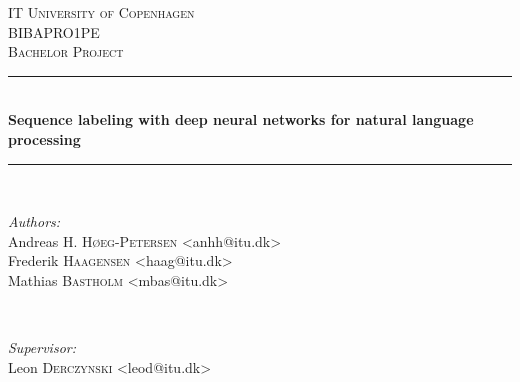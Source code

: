 \begin{titlepage}

\newcommand{\HRule}{\rule{\linewidth}{0.5mm}} %

\center %


\textsc{\LARGE IT University of Copenhagen}\\[1.5cm] %
\textsc{\Large BIBAPRO1PE}\\[0.5cm] %
\textsc{\large Bachelor Project}\\[0.5cm] %


\HRule \\[0.4cm]
{ \huge \bfseries Sequence labeling with deep neural networks for natural language processing}\\[0.4cm] %
\HRule \\[1.5cm]


\begin{minipage}{0.4\textwidth}
\begin{flushleft} \large
\emph{Authors:}\\
Andreas H. \textsc{Høeg-Petersen} <anhh@itu.dk> \\
Frederik \textsc{Haagensen} <haag@itu.dk> \\
Mathias \textsc{Bastholm} <mbas@itu.dk>
\end{flushleft}
\end{minipage}
~
\begin{minipage}{0.4\textwidth}
\begin{flushright} \large
\emph{Supervisor:} \\
Leon \textsc{Derczynski} <leod@itu.dk>
\end{flushright}
\end{minipage}\\[4cm]



\end{titlepage}
